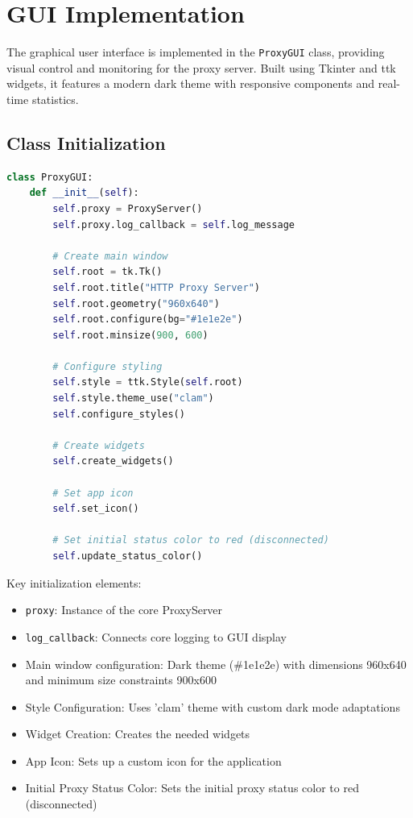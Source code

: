 \documentclass[a4paper]{article}
\begin{document}
	\section{GUI Implementation}
	\label{sec:gui}
	
	The graphical user interface is implemented in the \texttt{ProxyGUI} class, providing visual control and monitoring for the proxy server. Built using Tkinter and ttk widgets, it features a modern dark theme with responsive components and real-time statistics.
	
	\subsection{Class Initialization}
	\vspace{0.5cm}
	\begin{lstlisting}[language=Python, caption=ProxyGUI Class Initialization]
class ProxyGUI:
	def __init__(self):
		self.proxy = ProxyServer()
		self.proxy.log_callback = self.log_message
		
		# Create main window
		self.root = tk.Tk()
		self.root.title("HTTP Proxy Server")
		self.root.geometry("960x640")
		self.root.configure(bg="#1e1e2e")
		self.root.minsize(900, 600)
		
		# Configure styling
		self.style = ttk.Style(self.root)
		self.style.theme_use("clam")
		self.configure_styles()
		
		# Create widgets
		self.create_widgets()
		
		# Set app icon
		self.set_icon()
		
		# Set initial status color to red (disconnected)
		self.update_status_color()
	\end{lstlisting}
	
	\pagebreak
	
	Key initialization elements:
	\begin{itemize}
		\item \texttt{proxy}: Instance of the core ProxyServer
		\item \texttt{log\_callback}: Connects core logging to GUI display
		\item Main window configuration: Dark theme (\#1e1e2e) with dimensions 960x640 and minimum size constraints 900x600
		\item Style Configuration: Uses 'clam' theme with custom dark mode adaptations
		\item Widget Creation: Creates the needed widgets
		\item App Icon: Sets up a custom icon for the application
		\item Initial Proxy Status Color: Sets the initial proxy status color to red (disconnected)
	\end{itemize}
	
\end{document}
